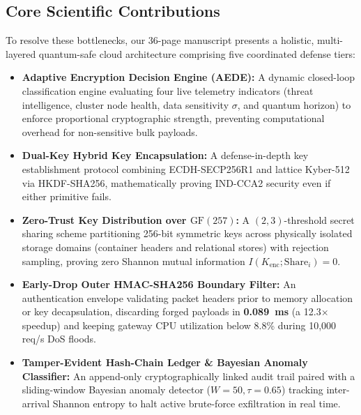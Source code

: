 \documentclass[11pt,a4paper]{article}
\begin{document}
\subsection*{Core Scientific Contributions}
To resolve these bottlenecks, our 36-page manuscript presents a holistic, multi-layered quantum-safe cloud architecture comprising five coordinated defense tiers:
\begin{itemize}
    \item \textbf{Adaptive Encryption Decision Engine (AEDE):} A dynamic closed-loop classification engine evaluating four live telemetry indicators (threat intelligence, cluster node health, data sensitivity $\sigma$, and quantum horizon) to enforce proportional cryptographic strength, preventing computational overhead for non-sensitive bulk payloads.
    \item \textbf{Dual-Key Hybrid Key Encapsulation:} A defense-in-depth key establishment protocol combining ECDH-SECP256R1 and lattice Kyber-512 via HKDF-SHA256, mathematically proving IND-CCA2 security even if either primitive fails.
    \item \textbf{Zero-Trust Key Distribution over $\text{GF}(257)$:} A $(2,3)$-threshold secret sharing scheme partitioning 256-bit symmetric keys across physically isolated storage domains (container headers and relational stores) with rejection sampling, proving zero Shannon mutual information $I(K_{\text{enc}}; \text{Share}_i) = 0$.
    \item \textbf{Early-Drop Outer HMAC-SHA256 Boundary Filter:} An authentication envelope validating packet headers prior to memory allocation or key decapsulation, discarding forged payloads in \textbf{0.089~ms} (a 12.3$\times$ speedup) and keeping gateway CPU utilization below 8.8\% during 10,000 req/s DoS floods.
    \item \textbf{Tamper-Evident Hash-Chain Ledger \& Bayesian Anomaly Classifier:} An append-only cryptographically linked audit trail paired with a sliding-window Bayesian anomaly detector ($W=50, \tau=0.65$) tracking inter-arrival Shannon entropy to halt active brute-force exfiltration in real time.
\end{itemize}
\end{document}
